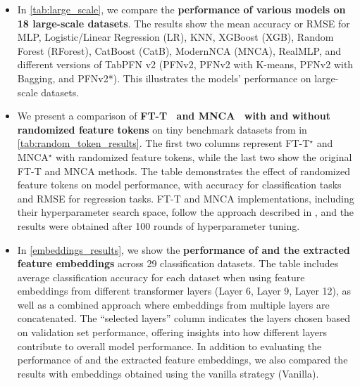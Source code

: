 \begin{itemize}
    \item In \autoref{tab:large_scale}, we compare the \textbf{performance of various models on 18 large-scale datasets}. The results show the mean accuracy or RMSE for MLP, Logistic/Linear Regression (LR), KNN, XGBoost (XGB), Random Forest (RForest), CatBoost (CatB), ModernNCA (MNCA), RealMLP, and different versions of TabPFN v2 (PFNv2, PFNv2 with K-means, PFNv2 with Bagging, and PFNv2*). This illustrates the models' performance on large-scale datasets.

    \item We present a comparison of \textbf{FT-T~\cite{GorishniyRKB21Revisiting} and MNCA~\cite{Ye2024ModernNCA} with and without randomized feature tokens} on tiny benchmark datasets from \citet{Ye2024Closer} in \autoref{tab:random_token_results}. The first two columns represent FT-T$^\star$ and MNCA$^\star$ with randomized feature tokens, while the last two show the original FT-T and MNCA methods. The table demonstrates the effect of randomized feature tokens on model performance, with accuracy for classification tasks and RMSE for regression tasks. FT-T and MNCA implementations, including their hyperparameter search space, follow the approach described in \citet{Liu2024Talent}, and the results were obtained after 100 rounds of hyperparameter tuning.

    \item In \autoref{embeddings_results}, we show the \textbf{performance of \ours and the extracted feature embeddings} across 29 classification datasets. The table includes average classification accuracy for each dataset when using feature embeddings from different transformer layers (Layer 6, Layer 9, Layer 12), as well as a combined approach where embeddings from multiple layers are concatenated. The ``selected layers'' column indicates the layers chosen based on validation set performance, offering insights into how different layers contribute to overall model performance. In addition to evaluating the performance of \ours and the extracted feature embeddings, we also compared the results with embeddings obtained using the vanilla strategy (Vanilla). 
\end{itemize}

